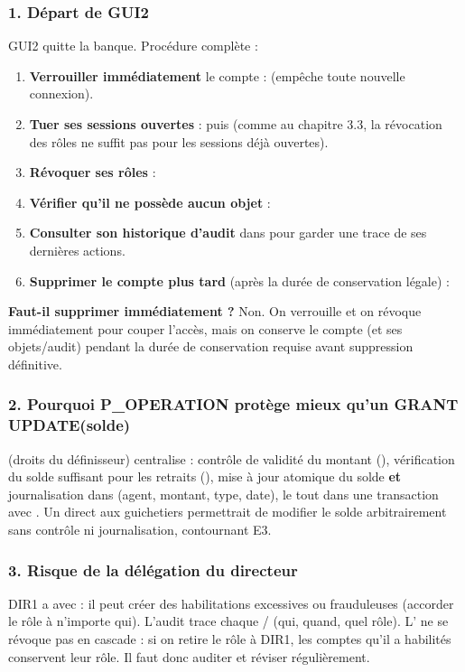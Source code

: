 \subsubsection{1. Départ de GUI2}
GUI2 quitte la banque. Procédure complète :
\begin{enumerate}
  \item \textbf{Verrouiller immédiatement} le compte :
         (empêche toute nouvelle connexion).
  \item \textbf{Tuer ses sessions ouvertes} :
         puis
        (comme au chapitre 3.3, la révocation des rôles ne suffit pas pour les sessions
        déjà ouvertes).
  \item \textbf{Révoquer ses rôles} : 
  \item \textbf{Vérifier qu'il ne possède aucun objet} :
  \item \textbf{Consulter son historique d'audit} dans 
        pour garder une trace de ses dernières actions.
  \item \textbf{Supprimer le compte plus tard} (après la durée de conservation légale)
        : 
\end{enumerate}
\textbf{Faut-il supprimer immédiatement ?} Non. On verrouille et on révoque
immédiatement pour couper l'accès, mais on conserve le compte (et ses objets/audit)
pendant la durée de conservation requise avant suppression définitive.

\subsubsection{2. Pourquoi P\_OPERATION protège mieux qu'un GRANT UPDATE(solde)}
 (droits du définisseur) centralise : contrôle de validité du montant
(), vérification du solde suffisant pour les retraits (),
mise à jour atomique du solde \textbf{et} journalisation dans  (agent,
montant, type, date), le tout dans une transaction avec . Un
 direct aux guichetiers permettrait de modifier le solde
arbitrairement sans contrôle ni journalisation, contournant E3.

\subsubsection{3. Risque de la délégation du directeur}
DIR1 a  avec  : il peut créer des habilitations
excessives ou frauduleuses (accorder le rôle à n'importe qui). L'audit
 trace chaque / (qui, quand, quel rôle).
L' ne se révoque pas en cascade : si on retire le rôle à DIR1, les
comptes qu'il a habilités conservent leur rôle. Il faut donc auditer et réviser
régulièrement.

